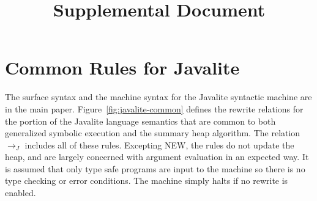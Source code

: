 \documentclass[pldi]{sigplanconf-pldi15}
\newcommand{\figref}[1]{Figure~\ref{#1}}
\newcommand{\com}{\ensuremath{J}}
\newcommand{\rcom}{\ensuremath{\rightarrow_\com}}
\begin{document}




\title{Supplemental Document}

\maketitle

\section{Common Rules for Javalite}


The surface syntax and the machine syntax for the Javalite syntactic
machine are in the main paper. \figref{fig:javalite-common} defines
the rewrite relations for the portion of the Javalite language
semantics that are common to both generalized symbolic execution and
the summary heap algorithm. The relation $\rcom$ includes all of these
rules. Excepting \textrm{N{\footnotesize EW}}, the rules do not update
the heap, and are largely concerned with argument evaluation in an
expected way. It is assumed that only type safe programs are input to
the machine so there is no type checking or error conditions. The
machine simply halts if no rewrite is enabled.

	
\end{document}
